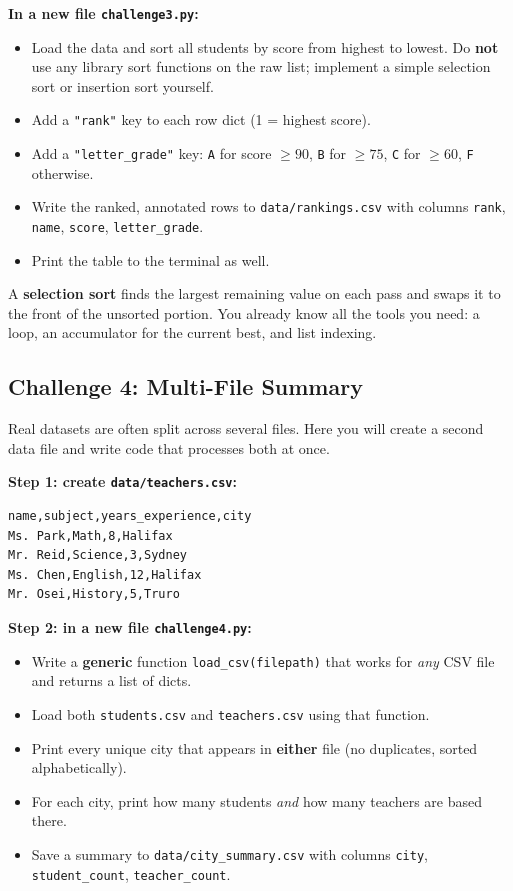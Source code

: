 \documentclass{cslab}
\begin{document}
\textbf{In a new file \texttt{challenge3.py}:}
\begin{itemize}
    \item Load the data and sort all students by score from highest to lowest. Do \textbf{not} use any library sort functions on the raw list; implement a simple selection sort or insertion sort yourself.
    \item Add a \texttt{"rank"} key to each row dict (1 = highest score).
    \item Add a \texttt{"letter\_grade"} key: \texttt{A} for score $\geq 90$, \texttt{B} for $\geq 75$, \texttt{C} for $\geq 60$, \texttt{F} otherwise.
    \item Write the ranked, annotated rows to \texttt{data/rankings.csv} with columns \texttt{rank}, \texttt{name}, \texttt{score}, \texttt{letter\_grade}.
    \item Print the table to the terminal as well.
\end{itemize}

\begin{note}
A \textbf{selection sort} finds the largest remaining value on each pass and swaps it to the front of the unsorted portion. You already know all the tools you need: a loop, an accumulator for the current best, and list indexing.
\end{note}

\subsection*{Challenge 4: Multi-File Summary}

Real datasets are often split across several files. Here you will create a second data file and write code that processes both at once.

\textbf{Step 1: create \texttt{data/teachers.csv}:}
\begin{lstlisting}[language={},numbers=none,frame=single]
name,subject,years_experience,city
Ms. Park,Math,8,Halifax
Mr. Reid,Science,3,Sydney
Ms. Chen,English,12,Halifax
Mr. Osei,History,5,Truro
\end{lstlisting}

\textbf{Step 2: in a new file \texttt{challenge4.py}:}
\begin{itemize}
    \item Write a \textbf{generic} function \texttt{load\_csv(filepath)} that works for \emph{any} CSV file and returns a list of dicts.
    \item Load both \texttt{students.csv} and \texttt{teachers.csv} using that function.
    \item Print every unique city that appears in \textbf{either} file (no duplicates, sorted alphabetically).
    \item For each city, print how many students \emph{and} how many teachers are based there.
    \item Save a summary to \texttt{data/city\_summary.csv} with columns \texttt{city}, \texttt{student\_count}, \texttt{teacher\_count}.
\end{itemize}
\end{document}
